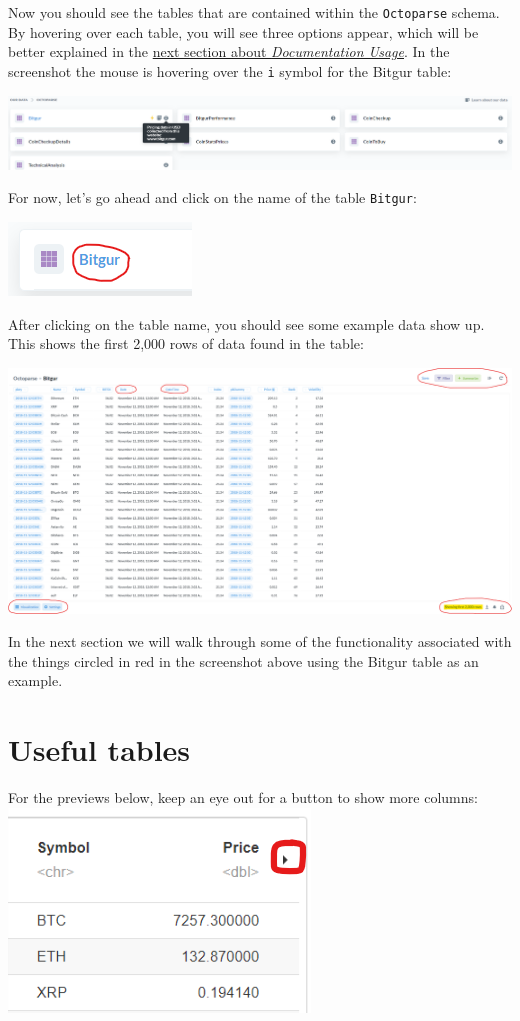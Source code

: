 \documentclass[]{book}
\begin{document}
Now you should see the tables that are contained within the \texttt{Octoparse} schema. By hovering over each table, you will see three options appear, which will be better explained in the \protect\hyperlink{documentation-usage}{next section about \emph{Documentation Usage}}. In the screenshot the mouse is hovering over the \texttt{i} symbol for the Bitgur table:

\includegraphics{images/OctoparseTableOptionsHover.png}

For now, let's go ahead and click on the name of the table \texttt{Bitgur}:

\includegraphics{images/BitgurTableSelect.png}

After clicking on the table name, you should see some example data show up. This shows the first 2,000 rows of data found in the table:

\includegraphics{images/BitgurPreview.png}

In the next section we will walk through some of the functionality associated with the things circled in red in the screenshot above using the Bitgur table as an example.

\hypertarget{useful-tables-1}{%
\section{Useful tables}\label{useful-tables-1}}

For the previews below, keep an eye out for a button to show more columns:
\includegraphics{images/MoreColumns.png}
\end{document}
